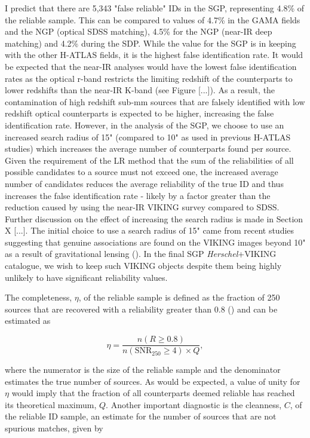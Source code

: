 I predict that there are 5,343 "false reliable" IDs in the SGP, representing 4.8\% of the reliable sample. This can be compared to values of 4.7\% in the GAMA fields and the NGP (optical SDSS matching), 4.5\% for the NGP (near-IR deep matching) and 4.2\% during the SDP. While the value for the SGP is in keeping with the other H-ATLAS fields, it is the highest false identification rate. It would be expected that the near-IR analyses would have the lowest false identification rates as the optical r-band restricts the limiting redshift of the counterparts to lower redshifts than the near-IR K-band (see Figure [...]). As a result, the contamination of high redshift sub-mm sources that are falsely identified with low redshift optical counterparts is expected to be higher, increasing the false identification rate. However, in the analysis of the SGP, we choose to use an increased search radius of 15" (compared to 10" as used in previous H-ATLAS studies) which increases the average number of counterparts found per source. Given the requirement of the LR method that the sum of the reliabilities of all possible candidates to a source must not exceed one, the increased average number of candidates reduces the average reliability of the true ID and thus increases the false identification rate - likely by a factor greater than the reduction caused by using the near-IR VIKING survey compared to SDSS. Further discussion on the effect of increasing the search radius is made in Section X [...]. The initial choice to use a search radius of 15" came from recent studies suggesting that genuine associations are found on the VIKING images beyond 10" as a result of gravitational lensing (\citealt{Bakx_2020}). In the final SGP \textit{Herschel}+VIKING catalogue, we wish to keep such VIKING objects despite them being highly unlikely to have significant reliability values.

The completeness, $\eta$, of the reliable sample is defined as the fraction of 250\,\micron sources that are recovered with a reliability greater than 0.8 (\citealt{Smith_2011}) and can be estimated as

\begin{equation}
    \eta = \frac{n(R \geq 0.8)}{n(\textrm{SNR}_{250} \geq 4) \times Q},
\label{eq:completeness}
\end{equation}

where the numerator is the size of the reliable sample and the denominator estimates the true number of sources. As would be expected, a value of unity for $\eta$ would imply that the fraction of all counterparts deemed reliable has reached its theoretical maximum, $Q$. Another important diagnostic is the cleanness, $C$, of the reliable ID sample, an estimate for the number of sources that are not spurious matches, given by

